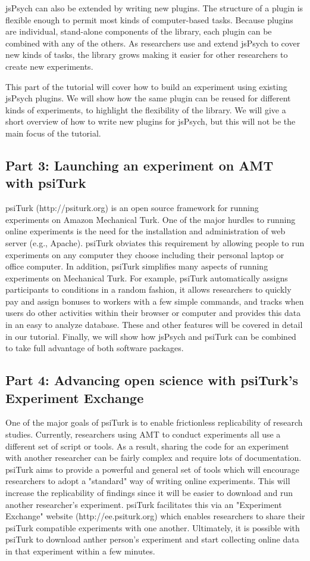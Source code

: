 \documentclass[10pt,letterpaper]{article}
\begin{document}
jsPsych can also be extended by writing new plugins. The structure of a plugin is flexible enough to permit most kinds of computer-based tasks. Because plugins are individual, stand-alone components of the library, each plugin can be combined with any of the others. As researchers use and extend jsPsych to cover new kinds of tasks, the library grows making it easier for other researchers to create new experiments.

This part of the tutorial will cover how to build an experiment using existing jsPsych plugins. We will show how the same plugin can be reused for different kinds of experiments, to highlight the flexibility of the library. We will give a short overview of how to write new plugins for jsPsych, but this will not be the main focus of the tutorial.

\subsection{Part 3: Launching an experiment on AMT with psiTurk}

psiTurk (http://psiturk.org) is an open source framework for running experiments on Amazon Mechanical Turk.  One of the major hurdles to running online experiments
is the need for the installation and administration of web server (e.g., Apache).  psiTurk obviates this requirement by allowing people to run experiments
on any computer they choose including their personal laptop or office computer.  In addition, psiTurk simplifies many aspects of running experiments
on Mechanical Turk.  For example, psiTurk automatically assigns participants to conditions in a random fashion, it allows researchers to quickly
pay and assign bonuses to workers with a few simple commands, and tracks when users do other activities within their browser or computer
and provides this data in an easy to analyze database.   These and other features will be covered in detail in our tutorial. Finally, we will show how jsPsych and psiTurk can be combined to take full advantage of both software packages.

\subsection{Part 4: Advancing open science with psiTurk's Experiment Exchange}

One of the major goals of psiTurk is to enable frictionless replicability of research studies.  Currently, researchers using AMT to conduct
experiments all use a different set of script or tools.  As a result, sharing the code for an experiment with another researcher can be fairly complex
and require lots of documentation.  psiTurk aims to provide a powerful and general set of tools which will encourage researchers to adopt
a "standard" way of writing online experiments.  This will increase the replicability of findings since it will be easier to download and run
another researcher's experiment.  psiTurk facilitates this via an "Experiment Exchange" website (http://ee.psiturk.org) which enables researchers 
to share their psiTurk compatible experiments with one another.  Ultimately, it is possible with psiTurk to download anther person's experiment 
and start collecting online data in that experiment within a few minutes.
\end{document}
